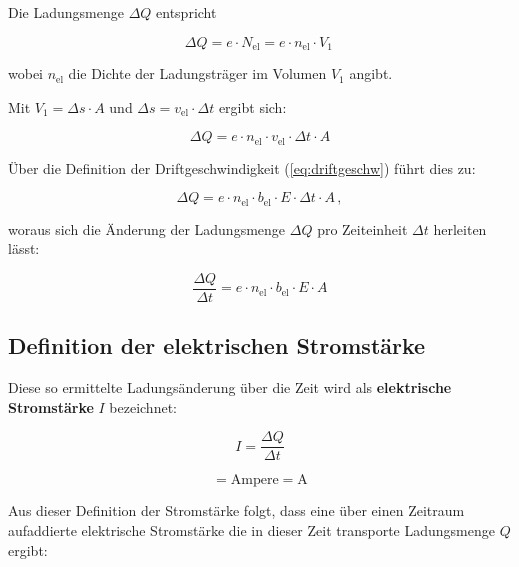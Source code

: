 { 
Die Ladungsmenge $\Delta Q$ entspricht

\begin{equation*}	
	\Delta Q = e \cdot N_\mathrm{el} = e \cdot n_\mathrm{el} \cdot V_1 \,
\end{equation*}

wobei $n_\mathrm{el}$ die Dichte der Ladungsträger im Volumen $V_1$ angibt.

Mit $V_1 = \Delta s \cdot A$ und $\Delta s = v_\mathrm{el}  \cdot \Delta t$ ergibt sich: 

\begin{equation*}	
	\Delta Q =  e \cdot n_\mathrm{el} \cdot v_\mathrm{el} \cdot \Delta t \cdot A
\end{equation*}

Über die Definition der Driftgeschwindigkeit (\ref{eq:driftgeschw}) führt dies zu:

\begin{equation*}	
	\Delta Q =  e \cdot n_\mathrm{el} \cdot b_\mathrm{el} \cdot E \cdot \Delta t \cdot A \, ,
\end{equation*}

woraus sich die Änderung der Ladungsmenge $\Delta Q$ pro Zeiteinheit $\Delta t$ herleiten lässt:

\begin{equation*}	
	\frac{\Delta Q}{\Delta t} =  e \cdot n_\mathrm{el} \cdot b_\mathrm{el} \cdot E \cdot A
\end{equation*}




\subsection{Definition der elektrischen Stromstärke}

Diese so ermittelte Ladungsänderung über die Zeit wird als \textbf{elektrische Stromstärke} $I$ bezeichnet:

\begin{equation}
	I = \frac{\Delta Q}{\Delta t}
	\label{eq:stromdef}
\end{equation}



\begin{equation*}
	[I] = \mathrm{Ampere} = \mathrm{A}
\end{equation*}



Aus dieser Definition der Stromstärke folgt, dass eine über einen Zeitraum aufaddierte elektrische 
Stromstärke die in dieser Zeit transporte Ladungsmenge $Q$ ergibt:

}
